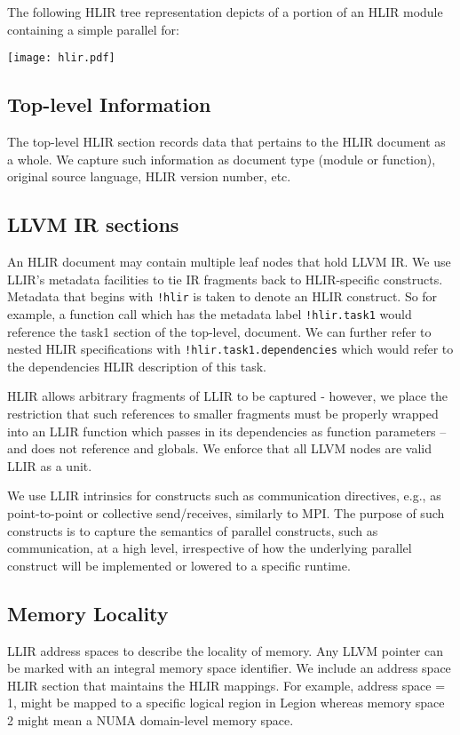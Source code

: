 \documentclass[12pt]{article}
\begin{document}
The following HLIR tree representation depicts of a portion of an HLIR module containing a simple parallel for:

\texttt{[image: hlir.pdf]}

\subsection{Top-level Information}

The top-level HLIR section records data that pertains to the HLIR document as a whole. We capture such information as document type (module or function), original source language, HLIR version number, etc.

\subsection{LLVM IR sections}

An HLIR document may contain multiple leaf nodes that hold LLVM IR. We use LLIR's metadata facilities to tie IR fragments back to HLIR-specific constructs.
Metadata that begins with {\tt !hlir} is taken to denote an HLIR construct. So for example, a function call which has the metadata label {\tt !hlir.task1} would reference the task1 section of the top-level, document. We can further refer to nested HLIR specifications with {\tt !hlir.task1.dependencies} which would refer to the dependencies HLIR description of this task.

HLIR allows arbitrary fragments of LLIR to be captured - however, we place the restriction that such references to smaller fragments must be properly wrapped into an LLIR function which passes in its dependencies as function parameters -- and does not reference and globals. We enforce that all LLVM nodes are valid LLIR as a unit.

We use LLIR intrinsics for constructs such as communication directives, e.g., as point-to-point or collective send/receives, similarly to MPI. The purpose of such constructs is to capture the semantics of parallel constructs, such as communication, at a high level, irrespective of how the underlying parallel construct will be implemented or lowered to a specific runtime.

\subsection{Memory Locality}

LLIR address spaces to describe the locality of memory. Any LLVM pointer can be marked with an integral memory space identifier. We include an address space HLIR section that maintains the HLIR mappings. For example, address space = 1, might be mapped to a specific logical region in Legion whereas memory space 2 might mean a NUMA domain-level memory space.
\end{document}
